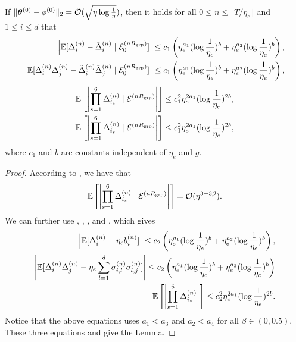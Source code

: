 \begin{lemma}\label{lmm:AGMs-Delta-SDE-bound}
    If $\|{\bm{\theta}}^{(0)}-\phi^{(0)}\|_2 = \mathcal{O}(\sqrt{\eta\log \frac{1}{\eta}})$, then it holds for all $0 \le n \le \lfloor T/\eta_e\rfloor$ and $1 \le i \le d$ that
    \begin{align*}
        \left|\mathbb{E}[\Delta_i^{(n)}-\tilde\Delta_i^{(n)}\mid \mathcal{E}_0^{(nR_{\mathrm{grp}})}]\right| \le c_1\left(\eta_e^{a_1}(\log\frac{1}{\eta_e})^b + \eta_e^{a_2}(\log\frac{1}{\eta_e})^b\right),\\
        \left|\mathbb{E}[\Delta_i^{(n)}\Delta_j^{(n)}-\tilde\Delta_i^{(n)}\tilde\Delta_j^{(n)} \mid \mathcal{E}_0^{(nR_{\mathrm{grp}})}]\right| \le c_1\left(\eta_e^{a_1}(\log\frac{1}{\eta_e})^b + \eta_e^{a_2}(\log\frac{1}{\eta_e})^b\right),
    \end{align*}
    \begin{align*}
        \mathbb{E}\left[\left|\prod_{s=1}^6\Delta_{i_{s}}^{(n)}\mid \mathcal{E}^{(nR_{\mathrm{grp}})}\right|\right] \le c_1^2 \eta_e^{2a_1}(\log \frac{1}{\eta_e})^{2b},\\
        \mathbb{E}\left[\left|\prod_{s=1}^6\tilde\Delta_{i_{s}}^{(n)}\mid \mathcal{E}^{(nR_{\mathrm{grp}})}\right|\right] \le c_1^2 \eta_e^{2a_1}(\log \frac{1}{\eta_e})^{2b},
    \end{align*}
    where $c_1$ and $b$ are constants independent of $\eta_e$ and $g$.
\end{lemma}
\begin{proof}
    According to , we have that
    \begin{align*}
         \mathbb{E}\left[\left|\prod_{s=1}^6\Delta_{i_{s}}^{(n)}\mid \mathcal{E}^{(nR_{\mathrm{grp}})}\right|\right] = \mathcal{O}(\eta^{3-3\beta}).
    \end{align*}
    We can further use , , , and , which gives
    \begin{align}
        \left|\mathbb{E}[\Delta_i^{(n)}-\eta_eb_i^{(n)}]\right| \le c_2\left(\eta_e^{a_1}(\log\frac{1}{\eta_e})^b + \eta_e^{a_2}(\log\frac{1}{\eta_e})^b\right),\\
        \left|\mathbb{E}[\Delta_i^{(n)}\Delta_j^{(n)}-\eta_e \sum_{l=1}^d\sigma_{i,l}^{(n)}\sigma_{l,j}^{(n)}]\right| \le c_2\left(\eta_e^{a_1}(\log\frac{1}{\eta_e})^b + \eta_e^{a_2}(\log\frac{1}{\eta_e})^b\right)\\
\mathbb{E}\left[\left|\prod_{s=1}^6\Delta_{i_{s}}^{(n)}\right|\right] \le c_2^2\eta_e^{2a_1}(\log\frac{1}{\eta_e})^{2b}.
    \end{align}
    Notice that the above equations uses $a_1 < a_3$ and $a_2 < a_4$ for all $\beta \in (0,0.5)$. These three equations and  give the Lemma.
\end{proof}
